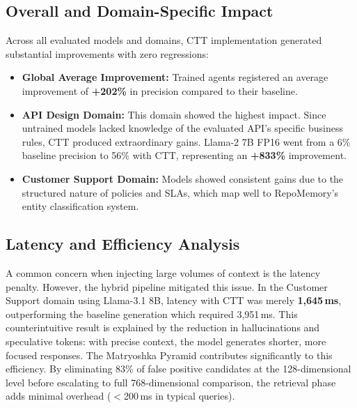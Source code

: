 \documentclass[conference]{IEEEtran}
\begin{document}
\subsection{Overall and Domain-Specific Impact}
Across all evaluated models and domains, CTT implementation generated substantial improvements with zero regressions:
\begin{itemize}
    \item \textbf{Global Average Improvement:} Trained agents registered an average improvement of \textbf{+202\%} in precision compared to their baseline.
    \item \textbf{API Design Domain:} This domain showed the highest impact. Since untrained models lacked knowledge of the evaluated API's specific business rules, CTT produced extraordinary gains. Llama-2 7B FP16 went from a 6\% baseline precision to 56\% with CTT, representing an \textbf{+833\%} improvement.
    \item \textbf{Customer Support Domain:} Models showed consistent gains due to the structured nature of policies and SLAs, which map well to RepoMemory's entity classification system.
\end{itemize}
\subsection{Latency and Efficiency Analysis}
A common concern when injecting large volumes of context is the latency penalty. However, the hybrid pipeline mitigated this issue. In the Customer Support domain using Llama-3.1 8B, latency with CTT was merely \textbf{1,645\,ms}, outperforming the baseline generation which required 3,951\,ms. This counterintuitive result is explained by the reduction in hallucinations and speculative tokens: with precise context, the model generates shorter, more focused responses.
The Matryoshka Pyramid contributes significantly to this efficiency. By eliminating 83\% of false positive candidates at the 128-dimensional level before escalating to full 768-dimensional comparison, the retrieval phase adds minimal overhead ($<$200\,ms in typical queries).
\end{document}
